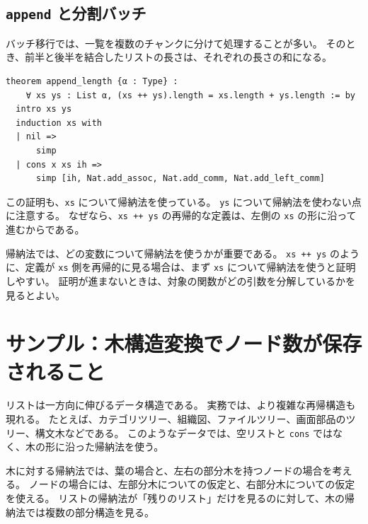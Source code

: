 \subsection{\texttt{append} と分割バッチ}

バッチ移行では、一覧を複数のチャンクに分けて処理することが多い。
そのとき、前半と後半を結合したリストの長さは、それぞれの長さの和になる。

\begin{listing}[htbp]
\begin{verbatim}
theorem append_length {α : Type} :
    ∀ xs ys : List α, (xs ++ ys).length = xs.length + ys.length := by
  intro xs ys
  induction xs with
  | nil =>
      simp
  | cons x xs ih =>
      simp [ih, Nat.add_assoc, Nat.add_comm, Nat.add_left_comm]
\end{verbatim}
\caption{append 後の長さは長さの和になる}
\label{lst:induction-append-length}
\end{listing}

この証明も、\texttt{xs} について帰納法を使っている。
\texttt{ys} について帰納法を使わない点に注意する。
なぜなら、\texttt{xs ++ ys} の再帰的な定義は、左側の \texttt{xs} の形に沿って進むからである。

\begin{warningbox}
帰納法では、どの変数について帰納法を使うかが重要である。
\texttt{xs ++ ys} のように、定義が \texttt{xs} 側を再帰的に見る場合は、まず \texttt{xs} について帰納法を使うと証明しやすい。
証明が進まないときは、対象の関数がどの引数を分解しているかを見るとよい。
\end{warningbox}

\section{サンプル：木構造変換でノード数が保存されること}

リストは一方向に伸びるデータ構造である。
実務では、より複雑な再帰構造も現れる。
たとえば、カテゴリツリー、組織図、ファイルツリー、画面部品のツリー、構文木などである。
このようなデータでは、空リストと \texttt{cons} ではなく、木の形に沿った帰納法を使う。

\begin{intuitionbox}
木に対する帰納法では、葉の場合と、左右の部分木を持つノードの場合を考える。
ノードの場合には、左部分木についての仮定と、右部分木についての仮定を使える。
リストの帰納法が「残りのリスト」だけを見るのに対して、木の帰納法では複数の部分構造を見る。
\end{intuitionbox}

